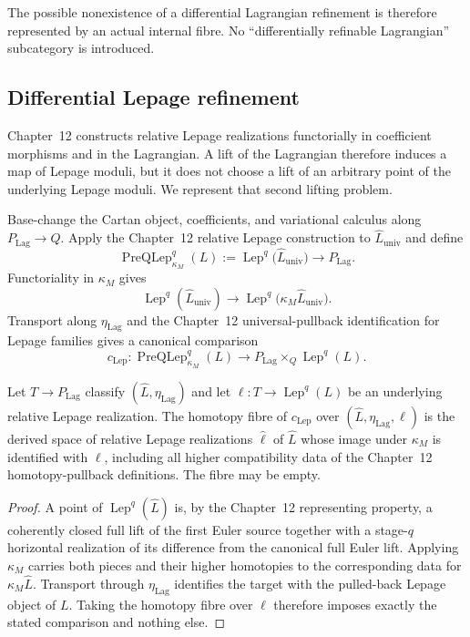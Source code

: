 The possible nonexistence of a differential Lagrangian refinement is therefore
represented by an actual internal fibre.  No ``differentially refinable
Lagrangian'' subcategory is introduced.

\subsection{Differential Lepage refinement}
\label{subsec:prequantum-differential-lepage-refinement}

Chapter~12 constructs relative Lepage realizations functorially in coefficient
morphisms and in the Lagrangian.  A lift of the Lagrangian therefore induces a
map of Lepage moduli, but it does not choose a lift of an arbitrary point of the
underlying Lepage moduli.  We represent that second lifting problem.

Base-change the Cartan object, coefficients, and variational calculus along
$P_{\mathrm{Lag}}\to Q$.  Apply the Chapter~12 relative Lepage construction to
$\widehat L_{\mathrm{univ}}$ and define
\[
\boxed{
\operatorname{PreQLep}_{\kappa_M}^{q}(L)
:=
\operatorname{Lep}^{q}
\bigl(\widehat L_{\mathrm{univ}}\bigr)
\longrightarrow
P_{\mathrm{Lag}}.
}
\]
Functoriality in $\kappa_M$ gives
\[
\operatorname{Lep}^{q}(\widehat L_{\mathrm{univ}})
\longrightarrow
\operatorname{Lep}^{q}
\bigl(\kappa_M\widehat L_{\mathrm{univ}}\bigr).
\]
Transport along $\eta_{\mathrm{Lag}}$ and the Chapter~12 universal-pullback
identification for Lepage families gives a canonical comparison
\[
\boxed{
c_{\mathrm{Lep}}:
\operatorname{PreQLep}_{\kappa_M}^{q}(L)
\longrightarrow
P_{\mathrm{Lag}}\times_Q\operatorname{Lep}^{q}(L).
}
\]

\begin{proposition}
\label{prop:prequantum-differential-lepage-refinement-meaning}
Let $T\to P_{\mathrm{Lag}}$ classify
$(\widehat L,\eta_{\mathrm{Lag}})$ and let
$\ell:T\to\operatorname{Lep}^{q}(L)$ be an underlying relative Lepage
realization.  The homotopy fibre of $c_{\mathrm{Lep}}$ over
$(\widehat L,\eta_{\mathrm{Lag}},\ell)$ is the derived space of relative Lepage
realizations $\widehat\ell$ of $\widehat L$ whose image under $\kappa_M$ is
identified with $\ell$, including all higher compatibility data of the Chapter~12
homotopy-pullback definitions.  The fibre may be empty.
\end{proposition}

\begin{proof}
A point of $\operatorname{Lep}^{q}(\widehat L)$ is, by the Chapter~12
representing property, a coherently closed full lift of the first Euler source
together with a stage-$q$ horizontal realization of its difference from the
canonical full Euler lift.  Applying $\kappa_M$ carries both pieces and their
higher homotopies to the corresponding data for $\kappa_M\widehat L$.  Transport
through $\eta_{\mathrm{Lag}}$ identifies the target with the pulled-back Lepage
object of $L$.  Taking the homotopy fibre over $\ell$ therefore imposes exactly
the stated comparison and nothing else.
\end{proof}

